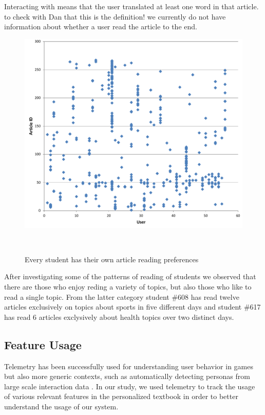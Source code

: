 \begin{added}

  Interacting with means that the user translated at least one word in that article. to check with Dan that this is the definition! we currently do not have information about whether a user read the article to the end. 

\end{added}

\begin{figure}[h!]
\centering
  \includegraphics[width=0.9\columnwidth]{figures/users_articles}
  \caption{Every student has their own article reading preferences}~\label{fig:articles_read}
\end{figure}

\begin{added}

  After investigating some of the patterns of reading of students we observed that there are those who enjoy reding a variety of topics, but also those who like to read a single topic. 
  From the latter category student \#608 has read twelve articles exclusively on topics about sports in five different days and student \#617 has read 6 articles exclysively about health topics over two distinct days.
  
\end{added}

\subsection{Feature Usage}
\newcommand{\feature}[1]{{\em #1}}
Telemetry has been successfully used for understanding user behavior in games \cite{Gagne11-telemetry} but also more generic contexts, such as automatically detecting personas from large scale interaction data \cite{Zhang16-telemetry}. In our study, we used telemetry to track the usage of various relevant features in the personalized textbook in order to better understand the usage of our system.

